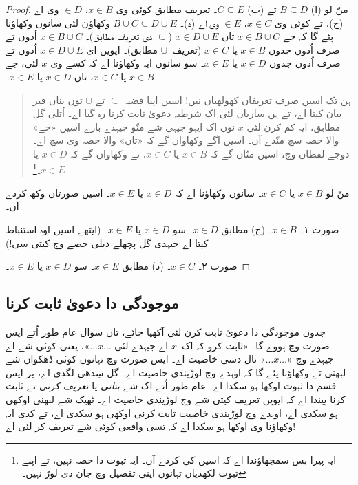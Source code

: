 \documentclass[../../../include/open-logic-section]{subfiles}
\begin{document}
\begin{proof}
  منّ لو (ا) $B \subseteq D$ تے (ب) $C \subseteq E$۔ تعریف مطابق کوئی وی $x \in B$، $\in D$ وی اے (ج)، تے کوئی وی $x \in C$، $\in E$ وی اے (د)۔ $B \cup C \subseteq D \cup E$ وکھاؤن لئی سانوں وکھاؤنا پئے گا کہ جے $x \in B \cup C$ تاں $x \in D \cup E$ ($\subseteq$ دی تعریف مطابق)۔ $x \in B \cup C$ اُدوں تے صرف اُدوں جدوں $x \in B$ یا $x \in
  C$ (تعریف~$\cup$ مطابق)۔ ایویں ای $x \in D \cup E$ اُدوں تے صرف اُدوں جدوں $x \in
  D$ یا $x \in E$۔ سو سانوں ایہ وکھاؤنا اے کہ کسے وی $x$ لئی، جے $x \in B$ یا $x \in C$، تاں $x \in D$ یا $x \in E$۔

  \begin{quote}
  ہن تک اسیں صرف تعریفاں کھولھیاں نیں!{} اسیں اپنا قضیہ $\subseteq$ تے $\cup$ توں بناں فیر بیان کیتا اے، تے ہن ساریاں لئی اک شرطیہ دعویٰ ثابت کرنا رہ گیا اے۔ اُتلی گل مطابق، ایہ کم کرن لئی $x$ نوں اک ایہو جیہی شے منّو جیہدے بارے اسیں «جے» والا حصہ سچ منّدے آں۔ اسیں اگے وکھاواں گے کہ «تاں» والا حصہ وی سچ اے۔ دوجے لفظاں وچ، اسیں منّاں گے کہ $x
  \in B$ یا $x \in C$، تے وکھاواں گے کہ $x \in D$ یا $x \in
  E$۔\footnote{ایہ پیرا بس سمجھاؤندا اے کہ اسیں کی کردے آں۔ ایہ ثبوت دا حصہ نہیں، تے اپنے ثبوت لکھدیاں تہانوں اینی تفصیل وچ جان دی لوڑ نہیں۔}
  \end{quote}

  منّ لو $x \in B$ یا $x \in C$۔ سانوں وکھاؤنا اے کہ $x \in D$ یا $x \in E$۔ اسیں صورتاں وکھ کردے آں۔

  صورت ۱۔ $x \in B$۔ (ج) مطابق $x \in D$۔ سو $x \in D$ یا $x \in
  E$۔ (ایتھے اسیں اوہ استنباط کیتا اے جیہدی گل پچھلے ذیلی حصے وچ کیتی سی!)

  صورت ۲۔ $x \in C$۔ (د) مطابق $x \in E$۔ سو $x \in D$ یا $x \in E$۔
 \end{proof}

\subsection{موجودگی دا دعویٰ ثابت کرنا}

جدوں موجودگی دا دعویٰ ثابت کرن لئی آکھیا جائے، تاں سوال عام طور اُتے ایس صورت وچ ہووے گا۔ «ثابت کرو کہ اک~$x$ اے جیہدے لئی $\dots x \dots$»، یعنی کوئی شے اے جیہدے وچ «$\dots x
\dots$» نال دسی خاصیت اے۔ ایس صورت وچ تہانوں کوئی ڈھکواں شے لبھنی تے وکھاؤنا پئے گا کہ اوہدے وچ لوڑیندی خاصیت اے۔ گل سِدھی لگدی اے، پر ایس قسم دا ثبوت اوکھا ہو سکدا اے۔ عام طور اُتے اک شے \emph{بنانی} یا \emph{تعریف کرنی} تے ثابت کرنا پیندا اے کہ ایویں تعریف کیتی شے وچ لوڑیندی خاصیت اے۔ ٹھیک شے لبھنی اوکھی ہو سکدی اے، اوہدے وچ لوڑیندی خاصیت ثابت کرنی اوکھی ہو سکدی اے، تے کدی ایہ وکھاؤنا وی اوکھا ہو سکدا اے کہ تسی واقعی کوئی شے تعریف کر لئی اے!{}
\end{document}
